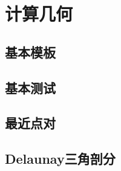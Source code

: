 \section{计算几何}
\subsection{基本模板}


\subsection{基本测试}


\subsection{最近点对}


\subsection{Delaunay三角剖分}

